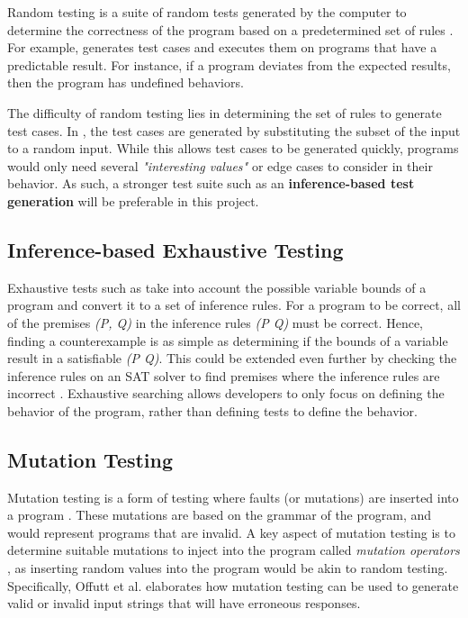 Random testing is a suite of random tests generated by the computer to determine the correctness of the program based on a predetermined 
set of rules \cite{differentialTesting}. For example, \cite[Sec. 2]{randomTesting} generates test cases and 
executes them on programs that have a predictable result. For instance, if a program deviates from the expected results, then the 
program has undefined behaviors.

The difficulty of random testing lies in determining the set of rules to generate test cases. In \cite{differentialTesting}, the test cases 
are generated by substituting the subset of the input to a random input. While this allows test cases to be generated quickly, programs would only 
need several \emph{"interesting values"} or edge cases to consider in their behavior. As such, a stronger test suite such as an 
\textbf{inference-based test generation} will be preferable in this project.

\subsection{Inference-based Exhaustive Testing}
\label{sec:inferenceTesting}

Exhaustive tests such as \cite{isabelleQuickcheck} take into account the possible variable bounds of a program and convert it to a set of 
inference rules. For a program to be correct, all of the premises \emph{(P, Q)} in the inference rules \emph{(P \rightarrow Q)} must be correct. Hence, 
finding a counterexample is as simple as determining if the bounds of a variable result in a satisfiable \emph{\lnot(P \rightarrow Q)}. 
This could be extended even further by checking the inference rules on an SAT solver to find premises where the inference rules are incorrect 
\cite[Ch. 5]{isabelleProof}. Exhaustive searching allows developers to only focus on defining the behavior of the program, rather than defining 
tests to define the behavior.

\subsection{Mutation Testing}
\label{sec:mutationTesting}

Mutation testing is a form of testing where faults (or mutations) are inserted into a program \cite{offutt_mutation_2006}. 
These mutations are based on the grammar of the program, and would represent programs that are invalid. A key aspect of mutation testing is to 
determine suitable mutations to inject into the program called \emph{mutation operators} \cite[Sec. 2]{offutt_mutation_2006}, 
as inserting random values into the program would be akin to random testing. Specifically, Offutt et al. \cite[Sec. 6]{offutt_mutation_2006} 
elaborates how mutation testing can be used to generate valid or invalid input strings that will have erroneous responses.

